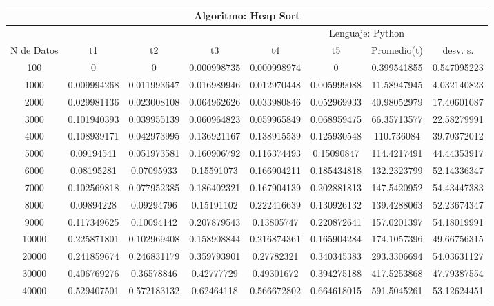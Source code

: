 \documentclass{article}
\begin{document}
    \begin{table}[]
        \begin{tabular}{|c|c|c|c|c|c|c|c| }
            \hline
            \multicolumn{8}{|c|}{Algoritmo: Heap Sort} \\ \hline
            \multicolumn{4}{|c|}{} & \multicolumn{4}{c|}{Lenguaje: Python} \\ \hline
              N de Datos &     t1    &  t2         &  t3          &   t4        &    t5     &   Promedio(t)       & desv. s. \\ \hline   
    100	    &0	            &0	            &0.000998735	&0.000998974	&0	             &0.399541855	 &0.547095223\\ \hline
    1000	&0.009994268	&0.011993647	&0.016989946	&0.012970448	&0.005999088	&11.58947945	 	&4.032140823\\ \hline
    2000	&0.029981136	&0.023008108	&0.064962626	&0.033980846	&0.052969933	&40.98052979	 	&17.40601087\\ \hline
    3000	&0.101940393	&0.039955139	&0.060964823	&0.059965849	&0.068959475	&66.35713577	 	&22.58279991\\ \hline
    4000	&0.108939171	&0.042973995	&0.136921167	&0.138915539	&0.125930548	&110.736084	        &39.70372012\\ \hline
    5000	&0.09194541	    &0.051973581	&0.160906792	&0.116374493	&0.15090847	    &114.4217491	 	&44.44353917\\ \hline
    6000	&0.08195281	    &0.07095933	    &0.15591073	    &0.166904211	&0.185434818	&132.2323799	 	&52.14336347\\ \hline
    7000	&0.102569818	&0.077952385	&0.186402321	&0.167904139	&0.202881813	&147.5420952	 	&54.43447383\\ \hline
    8000	&0.09894228	    &0.09294796	    &0.15191102	    &0.222416639	&0.130926132	&139.4288063	 	&52.23674347\\ \hline
    9000	&0.117349625	&0.10094142	    &0.207879543	&0.13805747	    &0.220872641	&157.0201397	 	&54.18019991\\ \hline
    10000	&0.225871801	&0.102969408	&0.158908844	&0.216874361	&0.165904284	&174.1057396	 	&49.66756315\\ \hline
    20000	&0.241859674	&0.246831179	&0.359793901	&0.27782321	    &0.340345383	&293.3306694	 	&54.03631127\\ \hline
    30000	&0.406769276	&0.36578846	    &0.42777729	    &0.49301672	    &0.394275188	&417.5253868	 	&47.79387554\\ \hline
    40000	&0.529407501	&0.572183132	&0.62464118	    &0.566672802	&0.664618015	&591.5045261	 	&53.12624451\\ \hline

\end{tabular}
\end{table}
\end{document}
